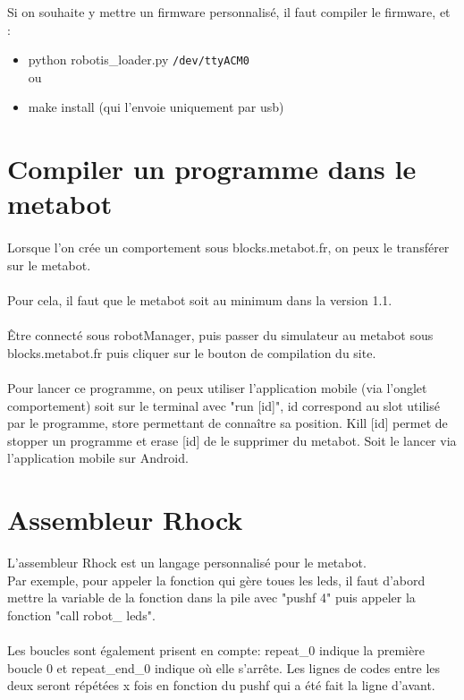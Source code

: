 \documentclass[10pt,a4paper]{report}
\begin{document}
Si on souhaite y mettre un firmware personnalisé, il faut compiler le firmware, et :
\begin{itemize}
\item python robotis\_loader.py \texttt{/dev/ttyACM0}
\\ou
\item make install (qui l'envoie uniquement par usb)
\end{itemize}

\section{Compiler un programme dans le metabot}
\paragraph{}
Lorsque l'on crée un comportement sous blocks.metabot.fr, on peux le transférer sur le metabot.
\paragraph{}
Pour cela, il faut que le metabot soit au minimum dans la version 1.1.
\paragraph{}
Être connecté sous robotManager, puis passer du simulateur au metabot sous blocks.metabot.fr puis cliquer sur le bouton de compilation du site.
\paragraph{}
Pour lancer ce programme, on peux utiliser l'application mobile (via l'onglet comportement) soit sur le terminal avec "run [id]", id correspond au slot utilisé par le programme, store permettant de connaître sa position. Kill [id] permet de stopper un programme et erase [id] de le supprimer du metabot.
Soit le lancer via l'application mobile sur Android.

\section{Assembleur Rhock}
L'assembleur Rhock est un langage personnalisé pour le metabot.\\
Par exemple, pour appeler la fonction qui gère toues les  leds, il faut d'abord mettre la variable de la fonction dans la pile avec "pushf 4" puis appeler la fonction "call robot\_ leds".
\paragraph{}
Les boucles sont également prisent en compte: repeat\_0 indique la première boucle 0 et repeat\_end\_0 indique où elle s'arrête. Les lignes de codes entre les deux seront répétées x fois en fonction du pushf qui a été fait la ligne d'avant.
\end{document}
